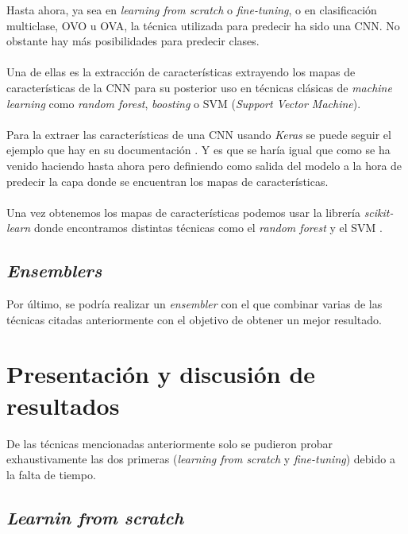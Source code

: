 Hasta ahora, ya sea en \textit{learning from scratch} o \textit{fine-tuning}, o en clasificación multiclase, OVO u OVA, la técnica utilizada para predecir ha sido una CNN. No obstante hay más posibilidades para predecir clases.
\\ \\
Una de ellas es la extracción de características extrayendo los mapas de características de la CNN para su posterior uso en técnicas clásicas de \textit{machine learning} como \textit{random forest}, \textit{boosting} o SVM (\textit{Support Vector Machine}).
\\ \\
Para la extraer las características de una CNN usando \textit{Keras} se puede seguir el ejemplo que hay en su documentación \cite{KerasApplications}. Y es que se haría igual que como se ha venido haciendo hasta ahora pero definiendo como salida del modelo a la hora de predecir la capa donde se encuentran los mapas de características.
\\ \\
Una vez obtenemos los mapas de características podemos usar la librería \textit{scikit-learn} \cite{Sklearn} donde encontramos distintas técnicas como el \textit{random forest} y el SVM \cite{KerasAndSklearn}.

\subsection{\textit{Ensemblers}}

Por último, se podría realizar un \textit{ensembler} con el que combinar varias de las técnicas citadas anteriormente con el objetivo de obtener un mejor resultado.

\section{Presentación y discusión de resultados}

De las técnicas mencionadas anteriormente solo se pudieron probar exhaustivamente las dos primeras (\textit{learning from scratch} y \textit{fine-tuning}) debido a la falta de tiempo.

\subsection{\textit{Learnin from scratch}}

